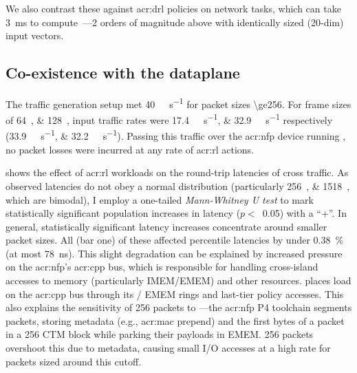 We also contrast these against \gls{acr:drl} policies on network tasks, which can take \qty{3}{\milli\second} to compute~\parencite{DBLP:journals/corr/abs-1910-04054}---2 orders of magnitude above \approachshort{} with identically sized (20-dim) input vectors.

\subsection{Co-existence with the dataplane}
The traffic generation setup met \qty{40}{\giga\bit\per\second} for packet sizes \qty{\ge256}{\byte}.
For frame sizes of \qtylist{64;128}{\byte}, input traffic rates were \qtylist{17.4;32.9}{\giga\bit\per\second} respectively (\qtylist[per-symbol=p,sticky-per=true]{33.9;32.2}{\mega\packet\per\second}).
Passing this traffic over the \gls{acr:nfp} device running \approachshort, no packet losses were incurred at any rate of \gls{acr:rl} actions.

 shows the effect of \gls{acr:rl} workloads on the round-trip latencies of cross traffic.
As observed latencies do not obey a normal distribution (particularly \qtylist{256;1518}{\byte}, which are bimodal), I employ a one-tailed \emph{Mann-Whitney U test} to mark statistically significant population increases in latency ($p <$~\num{0.05}) with a ``+''.
In general, statistically significant latency increases concentrate around smaller packet sizes.
All (bar one) of these affected  percentile latencies by under \qty{0.38}{\percent} (at most \qty{78}{\nano\second}).
This slight degradation can be explained by increased pressure on the \gls{acr:nfp}'s \gls{acr:cpp} bus, which is responsible for handling cross-island accesses to memory (particularly IMEM/EMEM) and other resources.
\approachshort{} places load on the \gls{acr:cpp} bus through its \inring{}/\outring{} EMEM rings and last-tier policy accesses.
This also explains the sensitivity of \qty{256}{\byte} packets to \approachshort{}---the \gls{acr:nfp} P4 toolchain segments packets, storing metadata (e.g., \gls{acr:mac} prepend) and the first bytes of a packet in a \qty{256}{\byte} CTM block while parking their payloads in EMEM.
\qty{256}{\byte} packets overshoot this due to metadata, causing small I/O accesses at a high rate for packets sized around this cutoff.

